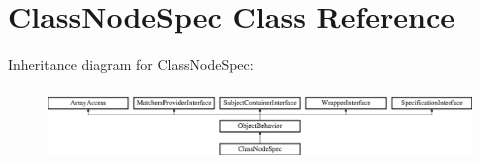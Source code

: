 \section{Class\+Node\+Spec Class Reference}
\label{classspec_1_1_prophecy_1_1_doubler_1_1_generator_1_1_node_1_1_class_node_spec}
Inheritance diagram for Class\+Node\+Spec\+:\begin{figure}[H]
\begin{center}
\leavevmode
\includegraphics[height=1.953488cm]{classspec_1_1_prophecy_1_1_doubler_1_1_generator_1_1_node_1_1_class_node_spec}
\end{center}
\end{figure}
